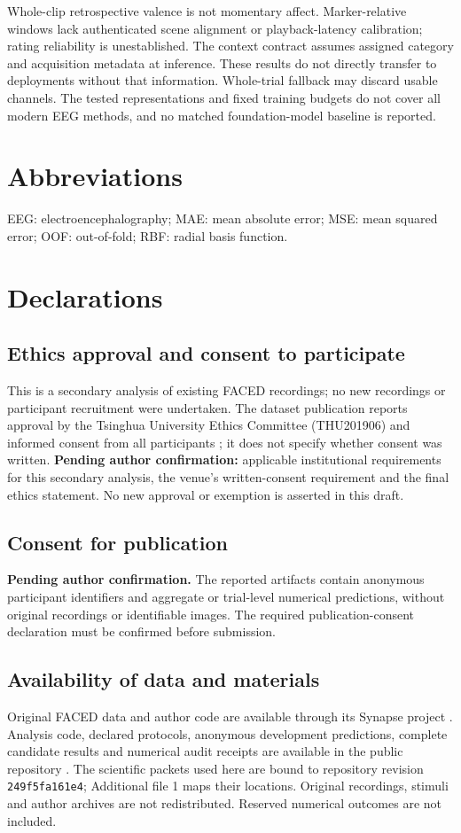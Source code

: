 \documentclass[11pt,a4paper]{article}
\begin{document}
Whole-clip retrospective valence is not momentary affect. Marker-relative windows lack authenticated scene alignment or playback-latency calibration; rating reliability is unestablished. The context contract assumes assigned category and acquisition metadata at inference. These results do not directly transfer to deployments without that information. Whole-trial fallback may discard usable channels. The tested representations and fixed training budgets do not cover all modern EEG methods, and no matched foundation-model baseline is reported.

\section*{Abbreviations}
EEG: electroencephalography; MAE: mean absolute error; MSE: mean squared error; OOF: out-of-fold; RBF: radial basis function.

\section*{Declarations}
\subsection*{Ethics approval and consent to participate}
This is a secondary analysis of existing FACED recordings; no new recordings or participant recruitment were undertaken. The dataset publication reports approval by the Tsinghua University Ethics Committee (THU201906) and informed consent from all participants \cite{chen2023faced}; it does not specify whether consent was written. \textbf{Pending author confirmation:} applicable institutional requirements for this secondary analysis, the venue's written-consent requirement and the final ethics statement. No new approval or exemption is asserted in this draft.

\subsection*{Consent for publication}
\textbf{Pending author confirmation.} The reported artifacts contain anonymous participant identifiers and aggregate or trial-level numerical predictions, without original recordings or identifiable images. The required publication-consent declaration must be confirmed before submission.

\subsection*{Availability of data and materials}
Original FACED data and author code are available through its Synapse project \cite{chen2023faced,faced2023release}. Analysis code, declared protocols, anonymous development predictions, complete candidate results and numerical audit receipts are available in the public repository \cite{analysisrepo2026}. The scientific packets used here are bound to repository revision \texttt{249f5fa161e4}; Additional file 1 maps their locations. Original recordings, stimuli and author archives are not redistributed. Reserved numerical outcomes are not included.
\end{document}
